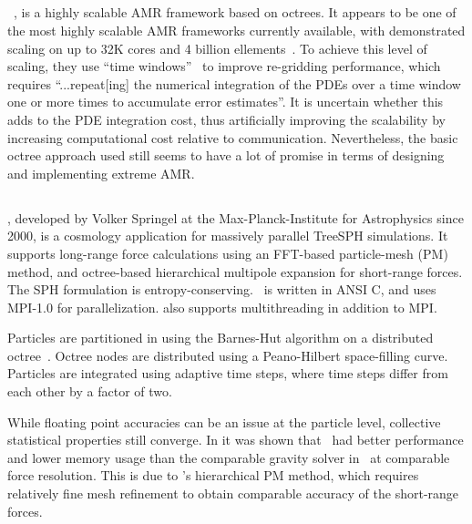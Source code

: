 \documentclass[10pt,twocolumn]{article}
\begin{document}
\subsection{\alps } \label{ss:alps}

\alps~\cite{BuBu09}, is a highly scalable AMR framework based on
octrees.  It appears to be one of the most highly scalable AMR
frameworks currently available, with demonstrated scaling on up to 32K
cores and 4 billion ellements~\cite{BuGh08}.  To achieve this level of
scaling, they use ``time windows''~\cite{SuWh04} to improve
re-gridding performance, which requires ``...repeat[ing] the numerical
integration of the PDEs over a time window one or more times to
accumulate error estimates''.  It is uncertain whether this adds to
the PDE integration cost, thus artificially improving the scalability
by increasing computational cost relative to communication.
Nevertheless, the basic octree approach used still seems to have a lot
of promise in terms of designing and implementing extreme AMR.


\subsection{\gadget } \label{ss:gadget}

\gadget, developed by Volker Springel at the Max-Planck-Institute for
Astrophysics since 2000, is a cosmology application for massively
parallel TreeSPH simulations.  It supports long-range force
calculations using an FFT-based particle-mesh (PM) method, and
octree-based hierarchical multipole expansion for short-range forces.
The SPH formulation is entropy-conserving.  \gadget\ is written in
ANSI C, and uses MPI-1.0 for parallelization.   also
supports multithreading in addition to MPI.

Particles are partitioned in  using the Barnes-Hut
algorithm on a distributed octree~\cite{BaHu86}.  Octree nodes are
distributed using a Peano-Hilbert space-filling curve.  Particles are
integrated using adaptive time steps, where time steps differ from
each other by a factor of two.

While floating point accuracies can be an issue at the particle level,
collective statistical properties still converge.  In \cite{OsNa05} it
was shown that \gadget\ had better performance and lower memory usage
than the comparable gravity solver in \enzo\ at comparable force
resolution.  This is due to \enzo's hierarchical PM method, which
requires relatively fine mesh refinement to obtain comparable accuracy
of the short-range forces.
\end{document}
